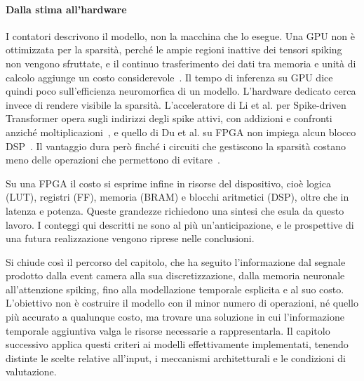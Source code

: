 \paragraph{Dalla stima all'hardware}
I contatori descrivono il modello, non la macchina che lo esegue. Una GPU non è ottimizzata per la sparsità, perché le ampie regioni inattive dei tensori spiking non vengono sfruttate, e il continuo trasferimento dei dati tra memoria e unità di calcolo aggiunge un costo considerevole~\cite{karamimanesh2025fpga}. Il tempo di inferenza su GPU dice quindi poco sull'efficienza neuromorfica di un modello. L'hardware dedicato cerca invece di rendere visibile la sparsità. L'acceleratore di Li et al. per Spike-driven Transformer opera sugli indirizzi degli spike attivi, con addizioni e confronti anziché moltiplicazioni~\cite{li2024sparseacc}, e quello di Du et al. su FPGA non impiega alcun blocco DSP~\cite{du2024spike}. Il vantaggio dura però finché i circuiti che gestiscono la sparsità costano meno delle operazioni che permettono di evitare~\cite{karamimanesh2025fpga}.

Su una FPGA il costo si esprime infine in risorse del dispositivo, cioè logica (LUT), registri (FF), memoria (BRAM) e blocchi aritmetici (DSP), oltre che in latenza e potenza. Queste grandezze richiedono una sintesi che esula da questo lavoro. I conteggi qui descritti ne sono al più un'anticipazione, e le prospettive di una futura realizzazione vengono riprese nelle conclusioni.

Si chiude così il percorso del capitolo, che ha seguito l'informazione dal segnale prodotto dalla event camera alla sua discretizzazione, dalla memoria neuronale all'attenzione spiking, fino alla modellazione temporale esplicita e al suo costo. L'obiettivo non è costruire il modello con il minor numero di operazioni, né quello più accurato a qualunque costo, ma trovare una soluzione in cui l'informazione temporale aggiuntiva valga le risorse necessarie a rappresentarla. Il capitolo successivo applica questi criteri ai modelli effettivamente implementati, tenendo distinte le scelte relative all'input, i meccanismi architetturali e le condizioni di valutazione.
